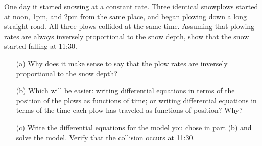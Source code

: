 \begin{problem}
    One day it started snowing at a constant rate. Three identical snowplows started at
    noon, 1pm, and 2pm from the same place, and began plowing down a long straight road.
    All three plows collided at the same time. Assuming that plowing rates are always
    inversely proportional to the snow depth, show that the snow started falling at 11:30.
    \begin{enumerate}
        \item[(a)] Why does it make sense to say that the plow rates are inversely
            proportional to the snow depth?
        \item[(b)] Which will be easier: writing differential equations in terms of the
            position of the plows as functions of time; or writing differential equations
            in terms of the time each plow has traveled as functions of position?  Why?
        \item[(c)] Write the differential equations for the model you chose in part (b)
            and solve the model.  Verify that the collision occurs at 11:30.
    \end{enumerate}
\end{problem}
